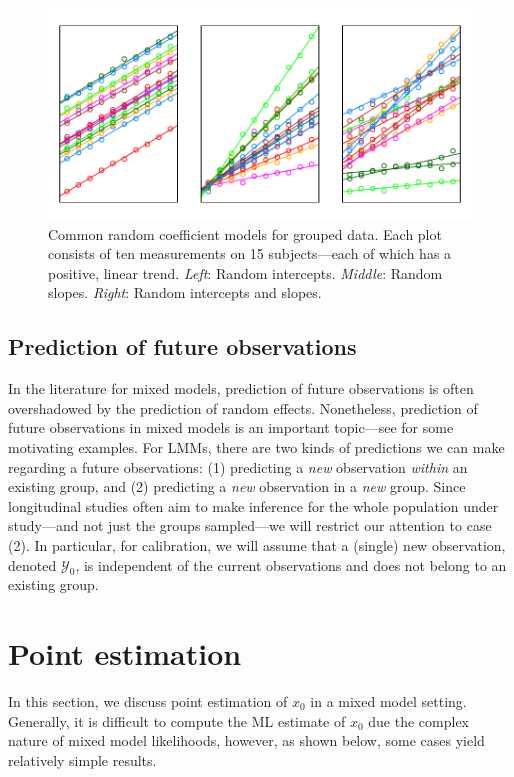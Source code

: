 \documentclass[cmfont,usenames,dvipsnames,leqno]{afit-etd}\usepackage[]{graphicx}\usepackage[]{color}
\makeatletter
\def\maxwidth{ %
  \ifdim\Gin@nat@width>\linewidth
    \linewidth
  \else
    \Gin@nat@width
  \fi
}
\newenvironment{knitrout}{}{} %
\renewenvironment{knitrout}{\begin{singlespace}}{\end{singlespace}}
\newcommand{\mc}[1]{\ensuremath{\mathcal{#1}}}
\makeatother
\begin{document}
\begin{knitrout}
\color{fgcolor}\begin{figure}[H]

\includegraphics[width=\maxwidth]{figure/random-coefficients} \caption[Common random coefficient models for grouped data]{Common random coefficient models for grouped data. Each plot consists of ten measurements on 15 subjects---each of which has a positive, linear trend. \textit{Left}: Random intercepts. \textit{Middle}: Random slopes. \textit{Right}: Random intercepts and slopes.\label{fig:random-coefficients}}
\end{figure}


\end{knitrout}


\subsection{Prediction of future observations}
In the literature for mixed models, prediction of future observations is often overshadowed by the prediction of random effects. Nonetheless, prediction of future observations in mixed models is an important topic---see \citet{jiang_linear_2007} for some motivating examples. For LMMs, there are two kinds of predictions we can make regarding a future observations: (1) predicting a \emph{new} observation \emph{within} an existing group, and (2) predicting a \emph{new} observation in a \emph{new} group. Since longitudinal studies often aim to make inference for the whole population under study---and not just the groups sampled---we will restrict our attention to case (2). In particular, for calibration, we will assume that a (single) new observation, denoted $\mc{Y}_0$, is independent of the current observations and does not belong to an existing group. 

\section{Point estimation}
\label{sec:calibration-lmm-point}
In this section, we discuss point estimation of $x_0$ in a mixed model setting. Generally, it is difficult to compute the \ac{ML} estimate of $x_0$ due the complex nature of mixed model likelihoods, however, as shown below, some cases yield relatively simple results. 
\end{document}
